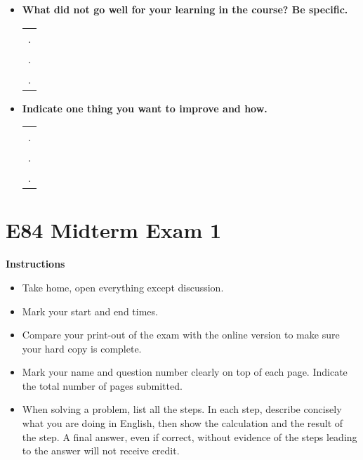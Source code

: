 \begin{itemize}
\begin{itemize}
\begin{tabular}{l}
.  \\
.  \\
.  \\
\end{tabular}
\vskip 5cm

\item {\bf What did not go well for your learning in the course? Be specific.}
\begin{tabular}{l}
.  \\
.  \\
.  \\
\end{tabular}
\vskip 0.9in

\item {\bf Indicate one thing you want to improve and how.}
\begin{tabular}{l}
.  \\
.  \\
.  \\
\end{tabular}
\vskip 0.9in

\end{itemize}

\end{itemize}


\section*{E84 Midterm Exam 1}

{\bf Instructions}
\begin{itemize}
\item Take home, open everything except discussion. 
\item Mark your start and end times. 
\item Compare your print-out of the exam with the online version to make
	sure your hard copy is complete.
\item Mark your name and question number clearly on top of each page.
	Indicate the total number of pages submitted.
\item When solving a problem, list all the steps. In each step, describe 
	concisely what you are doing in English, then show the calculation 
	and the result of the step. A final answer, even if correct, without 
	evidence of the steps leading to the answer will not receive credit.
\end{itemize}

